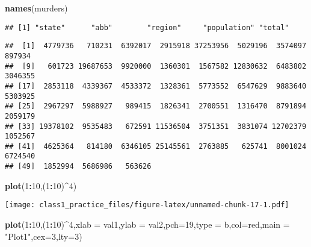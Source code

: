 \documentclass[
]{article}
\newenvironment{Shaded}{\begin{snugshade}}{\end{snugshade}}
\newcommand{\AttributeTok}[1]{\textcolor[rgb]{0.13,0.29,0.53}{#1}}
\newcommand{\DecValTok}[1]{\textcolor[rgb]{0.00,0.00,0.81}{#1}}
\newcommand{\FunctionTok}[1]{\textcolor[rgb]{0.13,0.29,0.53}{\textbf{#1}}}
\newcommand{\NormalTok}[1]{#1}
\newcommand{\SpecialCharTok}[1]{\textcolor[rgb]{0.81,0.36,0.00}{\textbf{#1}}}
\newcommand{\StringTok}[1]{\textcolor[rgb]{0.31,0.60,0.02}{#1}}
\begin{document}
\begin{Shaded}
\begin{Highlighting}[]
\FunctionTok{names}\NormalTok{(murders)}
\end{Highlighting}
\end{Shaded}

\begin{verbatim}
## [1] "state"      "abb"        "region"     "population" "total"
\end{verbatim}

\begin{Shaded}
\end{Shaded}

\begin{verbatim}
##  [1]  4779736   710231  6392017  2915918 37253956  5029196  3574097   897934
##  [9]   601723 19687653  9920000  1360301  1567582 12830632  6483802  3046355
## [17]  2853118  4339367  4533372  1328361  5773552  6547629  9883640  5303925
## [25]  2967297  5988927   989415  1826341  2700551  1316470  8791894  2059179
## [33] 19378102  9535483   672591 11536504  3751351  3831074 12702379  1052567
## [41]  4625364   814180  6346105 25145561  2763885   625741  8001024  6724540
## [49]  1852994  5686986   563626
\end{verbatim}

\begin{Shaded}
\begin{Highlighting}[]
\FunctionTok{plot}\NormalTok{(}\DecValTok{1}\SpecialCharTok{:}\DecValTok{10}\NormalTok{,(}\DecValTok{1}\SpecialCharTok{:}\DecValTok{10}\NormalTok{)}\SpecialCharTok{\^{}}\DecValTok{4}\NormalTok{)}
\end{Highlighting}
\end{Shaded}

\texttt{[image: class1\_practice\_files/figure-latex/unnamed-chunk-17-1.pdf]}

\begin{Shaded}
\begin{Highlighting}[]
\FunctionTok{plot}\NormalTok{(}\DecValTok{1}\SpecialCharTok{:}\DecValTok{10}\NormalTok{,(}\DecValTok{1}\SpecialCharTok{:}\DecValTok{10}\NormalTok{)}\SpecialCharTok{\^{}}\DecValTok{4}\NormalTok{,}\AttributeTok{xlab =} \StringTok{\textquotesingle{}val1\textquotesingle{}}\NormalTok{,}\AttributeTok{ylab =} \StringTok{\textquotesingle{}val2\textquotesingle{}}\NormalTok{,}\AttributeTok{pch=}\DecValTok{19}\NormalTok{,}\AttributeTok{type =} \StringTok{\textquotesingle{}b\textquotesingle{}}\NormalTok{,}\AttributeTok{col=}\StringTok{\textquotesingle{}red\textquotesingle{}}\NormalTok{,}\AttributeTok{main =} \StringTok{"Plot1"}\NormalTok{,}\AttributeTok{cex=}\DecValTok{3}\NormalTok{,}\AttributeTok{lty=}\DecValTok{3}\NormalTok{)}
\end{Highlighting}
\end{Shaded}
\end{document}
